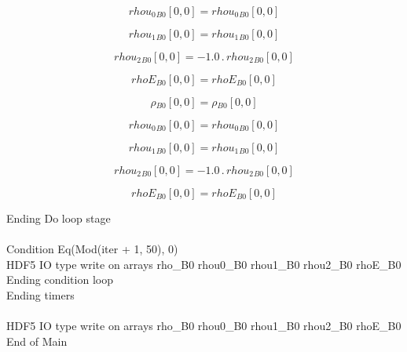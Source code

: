 \documentclass{article}
\begin{document}
\begin{dmath}{rhou_{0}{_{B0}}}[{0,0}] = {rhou_{0}{_{B0}}}[{0,0}]\end{dmath}

\begin{dmath}{rhou_{1}{_{B0}}}[{0,0}] = {rhou_{1}{_{B0}}}[{0,0}]\end{dmath}

\begin{dmath}{rhou_{2}{_{B0}}}[{0,0}] = - 1.0 \,.\, {rhou_{2}{_{B0}}}[{0,0}]\end{dmath}

\begin{dmath}{rhoE{_{B0}}}[{0,0}] = {rhoE{_{B0}}}[{0,0}]\end{dmath}

\begin{dmath}{\rho{_{B0}}}[{0,0}] = {\rho{_{B0}}}[{0,0}]\end{dmath}

\begin{dmath}{rhou_{0}{_{B0}}}[{0,0}] = {rhou_{0}{_{B0}}}[{0,0}]\end{dmath}

\begin{dmath}{rhou_{1}{_{B0}}}[{0,0}] = {rhou_{1}{_{B0}}}[{0,0}]\end{dmath}

\begin{dmath}{rhou_{2}{_{B0}}}[{0,0}] = - 1.0 \,.\, {rhou_{2}{_{B0}}}[{0,0}]\end{dmath}

\begin{dmath}{rhoE{_{B0}}}[{0,0}] = {rhoE{_{B0}}}[{0,0}]\end{dmath}

\noindent Ending Do loop stage\\
\\\noindent Condition Eq(Mod(iter + 1, 50), 0)\\\noindent HDF5 IO type write on arrays rho_B0 rhou0_B0 rhou1_B0 rhou2_B0 rhoE_B0\\\noindent Ending condition loop %
\\\noindent Ending timers\\
\\\noindent HDF5 IO type write on arrays rho_B0 rhou0_B0 rhou1_B0 rhou2_B0 rhoE_B0\\\noindent End of Main\\
\end{document}
